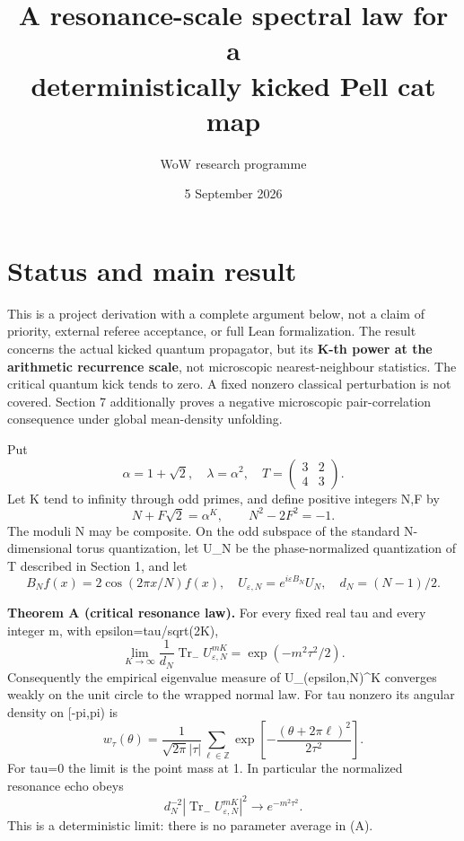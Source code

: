 \documentclass[11pt,a4paper]{article}
\title{A resonance-scale spectral law for a\\deterministically kicked Pell cat map}
\author{WoW research programme}
\date{5 September 2026}
\begin{document}
\maketitle
\hypertarget{status-and-main-result}{%
\section{Status and main result}\label{status-and-main-result}}

This is a project derivation with a complete argument below, not a claim of priority, external referee acceptance, or full Lean formalization. The result concerns the actual kicked quantum propagator, but its \textbf{K-th power at the arithmetic recurrence scale}, not microscopic nearest-neighbour statistics. The critical quantum kick tends to zero. A fixed nonzero classical perturbation is not covered. Section 7 additionally proves a negative microscopic pair-correlation consequence under global mean-density unfolding.

Put \[
 \alpha=1+\sqrt2,\quad \lambda=\alpha^2,\quad
 T=\begin{pmatrix}3&2\\4&3\end{pmatrix}.
\] Let K tend to infinity through odd primes, and define positive integers N,F by \[
 N+F\sqrt2=\alpha^K,\qquad N^2-2F^2=-1.
\] The moduli N may be composite. On the odd subspace of the standard N-dimensional torus quantization, let U\_N be the phase-normalized quantization of T described in Section 1, and let \[
 B_N f(x)=2\cos(2\pi x/N)f(x),\quad
 U_{\varepsilon,N}=e^{i\varepsilon B_N}U_N,\quad
 d_N=(N-1)/2.
\]

\textbf{Theorem A (critical resonance law).} For every fixed real tau and every integer m, with epsilon=tau/sqrt(2K), \[
 \lim_{K\longrightarrow\infty}
 \frac{1}{d_N}\operatorname{Tr}_{-}
       U_{\varepsilon,N}^{mK}
       =\exp(-m^2\tau^2/2).                                      \tag{A}
\] Consequently the empirical eigenvalue measure of U\_(epsilon,N)\^{}K converges weakly on the unit circle to the wrapped normal law. For tau nonzero its angular density on {[}-pi,pi) is \[
 w_\tau(\theta)=\frac{1}{\sqrt{2\pi}|\tau|}
       \sum_{\ell\in\mathbb Z}
       \exp\!\left[-\frac{(\theta+2\pi\ell)^2}{2\tau^2}\right].   \tag{B}
\] For tau=0 the limit is the point mass at 1. In particular the normalized resonance echo obeys \[
 d_N^{-2}\left|\operatorname{Tr}_{-}U_{\varepsilon,N}^{mK}\right|^2
       \longrightarrow e^{-m^2\tau^2}.                          \tag{C}
\] This is a deterministic limit: there is no parameter average in (A).
\end{document}
